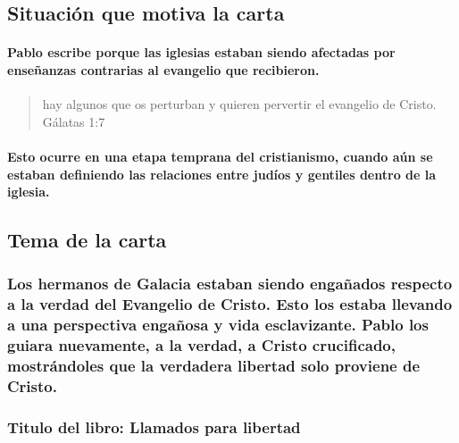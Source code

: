 \documentclass[11a pt,twoside]{article}
\let\oldsubsection\subsection
\renewcommand{\subsection}{\needspace{5\baselineskip}\oldsubsection}
\let\oldsubsubsection\subsubsection
\renewcommand{\subsubsection}{\needspace{4\baselineskip}\oldsubsubsection}
\let\oldparagraph\paragraph
\renewcommand{\paragraph}{\needspace{3\baselineskip}\oldparagraph}
\begin{document}
\subsection{Situación que motiva la
carta}\label{situaciuxf3n-que-motiva-la-carta}

\paragraph{Pablo escribe porque las iglesias estaban siendo afectadas
por enseñanzas contrarias al evangelio que
recibieron.}\label{pablo-escribe-porque-las-iglesias-estaban-siendo-afectadas-por-enseuxf1anzas-contrarias-al-evangelio-que-recibieron.}

\begin{quote}
hay algunos que os perturban y quieren pervertir el evangelio de Cristo.
Gálatas 1:7
\end{quote}

\paragraph{Esto ocurre en una etapa temprana del cristianismo, cuando
aún se estaban definiendo las relaciones entre judíos y gentiles dentro
de la
iglesia.}\label{esto-ocurre-en-una-etapa-temprana-del-cristianismo-cuando-auxfan-se-estaban-definiendo-las-relaciones-entre-juduxedos-y-gentiles-dentro-de-la-iglesia.}

\subsection{Tema de la carta}\label{tema-de-la-carta}

\subsubsection{Los hermanos de Galacia estaban siendo engañados respecto
a la verdad del Evangelio de Cristo. Esto los estaba llevando a una
perspectiva engañosa y vida esclavizante. Pablo los guiara nuevamente, a
la verdad, a Cristo crucificado, mostrándoles que la verdadera libertad
solo proviene de
Cristo.}\label{los-hermanos-de-galacia-estaban-siendo-engauxf1ados-respecto-a-la-verdad-del-evangelio-de-cristo.-esto-los-estaba-llevando-a-una-perspectiva-engauxf1osa-y-vida-esclavizante.-pablo-los-guiara-nuevamente-a-la-verdad-a-cristo-crucificado-mostruxe1ndoles-que-la-verdadera-libertad-solo-proviene-de-cristo.}

\subsubsection{Titulo del libro: Llamados para
libertad}\label{titulo-del-libro-llamados-para-libertad}
\end{document}
